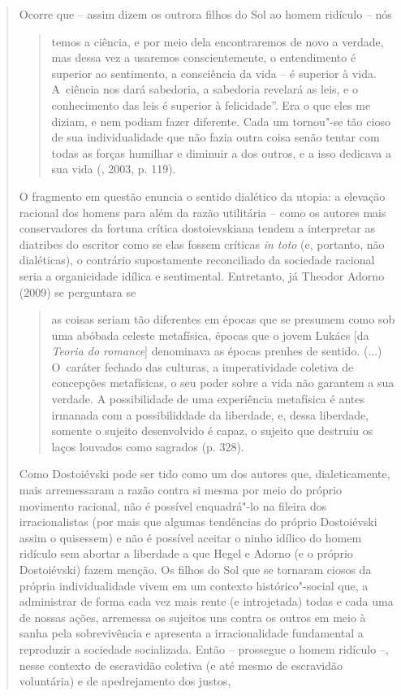 {\begin{quote}
Ocorre que -- assim dizem os outrora filhos do Sol ao homem ridículo --
nós

\begin{quote}
temos a ciência, e por meio dela encontraremos de novo a verdade, mas
dessa vez a usaremos conscientemente, o entendimento é superior ao
sentimento, a consciência da vida -- é superior à vida. A~ciência nos
dará sabedoria, a sabedoria revelará as leis, e o conhecimento das leis
é superior à felicidade''. Era o que eles me diziam, e nem podiam fazer
diferente. Cada um tornou"-se tão cioso de sua individualidade que não
fazia outra coisa senão tentar com todas as forças humilhar e diminuir a
dos outros, e a isso dedicava a sua vida (, 2003, p. 119).
\end{quote}

O fragmento em questão enuncia o sentido dialético da utopia: a elevação
racional dos homens para além da razão utilitária -- como os autores
mais conservadores da fortuna crítica dostoievskiana tendem a
interpretar as diatribes do escritor como se elas fossem críticas
\emph{in toto} (e, portanto, não dialéticas), o contrário supostamente
reconciliado da sociedade racional seria a organicidade idílica e
sentimental. Entretanto, já Theodor Adorno (2009) se perguntara se

\begin{quote}
as coisas seriam tão diferentes em épocas que se presumem como sob uma
abóbada celeste metafísica, épocas que o jovem Lukács {[}da \emph{Teoria
do romance}{]} denominava as épocas prenhes de sentido. (...) O~caráter
fechado das culturas, a imperatividade coletiva de concepções
metafísicas, o seu poder sobre a vida não garantem a sua verdade. A
possibilidade de uma experiência metafísica é antes irmanada com a
possibiliddade da liberdade, e, dessa liberdade, somente o sujeito
desenvolvido é capaz, o sujeito que destruiu os laços louvados como
sagrados (p. 328).
\end{quote}

Como Dostoiévski pode ser tido como um dos autores que, dialeticamente,
mais arremessaram a razão contra si mesma por meio do próprio movimento
racional, não é possível enquadrá"-lo na fileira dos irracionalistas (por
mais que algumas tendências do próprio Dostoiévski assim o quisessem) e
não é possível aceitar o ninho idílico do homem ridículo sem abortar a
liberdade a que Hegel e Adorno (e o próprio Dostoiévski) fazem menção.
Os filhos do Sol que se tornaram ciosos da própria individualidade vivem
em um contexto histórico"-social que, a administrar de forma cada vez
mais rente (e introjetada) todas e cada uma de nossas ações, arremessa
os sujeitos uns contra os outros em meio à sanha pela sobrevivência e
apresenta a irracionalidade fundamental a reproduzir a sociedade
socializada. Então -- prossegue o homem ridículo --, nesse contexto de
escravidão coletiva (e até mesmo de escravidão voluntária) e de
apedrejamento dos justos,


\end{quote}}
